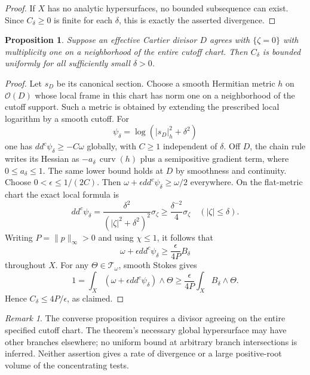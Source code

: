 \documentclass[11pt]{article}
\newtheorem{proposition}{Proposition}
\theoremstyle{remark}\newtheorem{remark}{Remark}
\newcommand{\ddc}{dd^c}
\begin{document}
\begin{proof}
If $X$ has no analytic hypersurfaces, no bounded subsequence can exist.
Since $C_\delta\geq0$ is finite for each $\delta$, this is exactly the
asserted divergence.
\end{proof}

\begin{proposition}\label{prop:divisor-bound}
Suppose an effective Cartier divisor $D$ agrees with $\{\zeta=0\}$
with multiplicity one on a neighborhood of the entire cutoff chart.
Then $C_\delta$ is bounded uniformly for all sufficiently small
$\delta>0$.
\end{proposition}
\begin{proof}
Let $s_D$ be its canonical section. Choose a smooth Hermitian metric
$h$ on $\mathcal O(D)$ whose local frame in this chart has norm one
on a neighborhood of the cutoff support. Such a metric is obtained by
extending the prescribed local logarithm by a smooth cutoff. For
\[
 \psi_\delta=\log(|s_D|_h^2+\delta^2)
\]
one has $\ddc\psi_\delta\geq-C\omega$ globally, with $C\geq1$
independent of $\delta$. Off $D$, the chain rule writes its Hessian
as $-a_\delta\,\operatorname{curv}(h)$ plus a semipositive gradient
term, where $0\leq a_\delta\leq1$. The same lower bound holds at
$D$ by smoothness and continuity. Choose $0<\epsilon\leq1/(2C)$.
Then $\omega+\epsilon\ddc\psi_\delta\geq\omega/2$ everywhere.
On the flat-metric chart the exact local formula is
\[
 \ddc\psi_\delta=
    \frac{\delta^2}{(|\zeta|^2+\delta^2)^2}\sigma_\zeta
    \geq\frac{\delta^{-2}}4\sigma_\zeta\quad(|\zeta|\leq\delta).
\]
Writing $P=\|p\|_\infty>0$ and using $\chi\leq1$, it follows that
\[
 \omega+\epsilon\ddc\psi_\delta
                    \geq\frac{\epsilon}{4P}B_\delta
\]
throughout $X$. For any $\Theta\in\mathcal T_\omega$, smooth Stokes gives
\[
 1=\int_X(\omega+\epsilon\ddc\psi_\delta)\wedge\Theta
       \geq\frac{\epsilon}{4P}\int_XB_\delta\wedge\Theta.
\]
Hence $C_\delta\leq4P/\epsilon$, as claimed.
\end{proof}

\begin{remark}
The converse proposition requires a divisor agreeing on the entire
specified cutoff chart. The theorem's necessary global hypersurface
may have other branches elsewhere; no uniform bound at arbitrary
branch intersections is inferred. Neither assertion gives a rate of
divergence or a large positive-root volume of the concentrating tests.
\end{remark}
\end{document}
